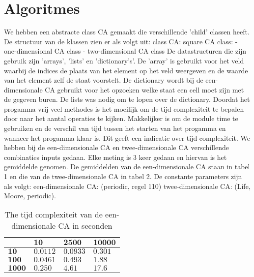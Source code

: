 \documentclass[12pt,a4paper]{article}
\begin{document}
\section*{Algoritmes}
We hebben een abstracte class CA gemaakt die verschillende 'child' classen heeft.
\newline
De structuur van de klassen zien er als volgt uit:
\newline
\phantom{.}class CA:
\newline
\phantom{.}\hspace{12pt}square CA class:
\newline
\phantom{.}\hspace{24pt}- one-dimensional CA class
\newline
\phantom{.}\hspace{24pt}- two-dimensional CA class
\vspace{6pt}
\newline
De datastructuren die zijn gebruik zijn 'arrays', 'lists' en 'dictionary's'. 
De 'array' is gebruikt voor het veld waarbij de indices de plaats van het element op het veld weergeven en 
de waarde van het element zelf de staat voorstelt.
De dictionary wordt bij de een-dimensionale CA gebruikt voor het opzoeken welke staat een cell moet zijn met de gegeven buren.
De lists was nodig om te lopen over de dictionary.
\newline
Doordat het progamma vrij veel methodes is het moeilijk om 
de tijd complexiteit te bepalen door naar het aantal operaties te kijken.
Makkelijker is om de module time te gebruiken en de verschil van tijd tussen het starten van het progamma en wanneer het progamma klaar is.
Dit geeft een indicatie over tijd complexiteit.  
We hebben bij de een-dimensionale CA en twee-dimensionale CA verschillende combinaties 
inputs gedaan. Elke meting is 3 keer gedaan en hiervan is het gemiddelde genomen.
De gemiddelden van de een-dimensionale CA staan in tabel 1 en die 
van de twee-dimensionale CA in tabel 2. De constante parameters zijn als volgt:
\newline
een-dimensionale CA: (periodic, regel 110)
\newline
twee-dimensionale CA: (Life, Moore, periodic).

\begin{table*}
    \centering
    \begin{tabular}{|m{1.2cm}|m{2.0cm}|m{2.0cm}|m{2.0cm}|}
        \hline
        $\phantom{.}$ & $\textbf{10}$ & $\textbf{2500}$ & $\textbf{10000}$ \\
        \hline
        $\textbf{10}$ & $0.0112$ & $0.0933$ & $0.301$ \\
        \hline
        $\textbf{100}$ & $0.0461$ & $0.493$ & $1.88$ \\
        \hline
        $\textbf{1000}$ & $0.250$ & $4.61$ & $17.6$ \\
        \hline
    \end{tabular}
    \caption{The tijd complexiteit van de een-dimensionale CA in seconden}
    \label{tbl:1dim}
\end{table*}
\end{document}
